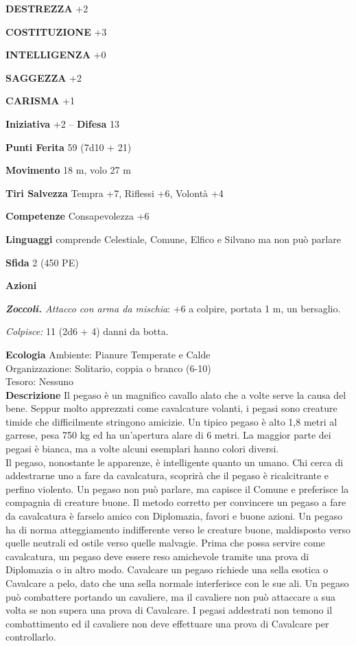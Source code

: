 \begin{multicols}{2}
\textbf{DESTREZZA} +2

\textbf{COSTITUZIONE} +3

\textbf{INTELLIGENZA} +0

\textbf{SAGGEZZA} +2

\textbf{CARISMA} +1

\textbf{Iniziativa} +2 -- \textbf{Difesa} 13

\textbf{Punti Ferita} 59 (7d10 + 21)

\textbf{Movimento} 18 m, volo 27 m

\textbf{Tiri Salvezza} Tempra +7, Riflessi +6, Volontà +4

\textbf{Competenze} Consapevolezza +6

\textbf{Linguaggi} comprende Celestiale, Comune, Elfico e Silvano ma non può parlare

\textbf{Sfida} 2 (450 PE)

\textbf{Azioni}

\emph{\textbf{Zoccoli.} Attacco con arma da mischia}: +6 a colpire, portata 1 m, un bersaglio.

\emph{Colpisce:} 11 (2d6 + 4) danni da botta.

\textbf{Ecologia}
Ambiente: Pianure Temperate e Calde\\
Organizzazione: Solitario, coppia o branco (6-10)\\
Tesoro: Nessuno\\
\textbf{Descrizione}
Il pegaso è un magnifico cavallo alato che a volte serve la causa del bene. Seppur molto apprezzati come cavalcature volanti, i pegasi sono creature timide che difficilmente stringono amicizie. Un tipico pegaso è alto 1,8 metri al garrese, pesa 750 kg ed ha un'apertura alare di 6 metri. La maggior parte dei pegasi è bianca, ma a volte alcuni esemplari hanno colori diversi.\\

Il pegaso, nonostante le apparenze, è intelligente quanto un umano. Chi cerca di addestrarne uno a fare da cavalcatura, scoprirà che il pegaso è ricalcitrante e perfino violento. Un pegaso non può parlare, ma capisce il Comune e preferisce la compagnia di creature buone. Il metodo corretto per convincere un pegaso a fare da cavalcatura è farselo amico con Diplomazia, favori e buone azioni. Un pegaso ha di norma atteggiamento indifferente verso le creature buone, maldisposto verso quelle neutrali ed ostile verso quelle malvagie. Prima che possa servire come cavalcatura, un pegaso deve essere reso amichevole tramite una prova di Diplomazia o in altro modo. Cavalcare un pegaso richiede una sella esotica o Cavalcare a pelo, dato che una sella normale interferisce con le sue ali. Un pegaso può combattere portando un cavaliere, ma il cavaliere non può attaccare a sua volta se non supera una prova di Cavalcare. I pegasi addestrati non temono il combattimento ed il cavaliere non deve effettuare una prova di Cavalcare per controllarlo.\\


\end{multicols}

